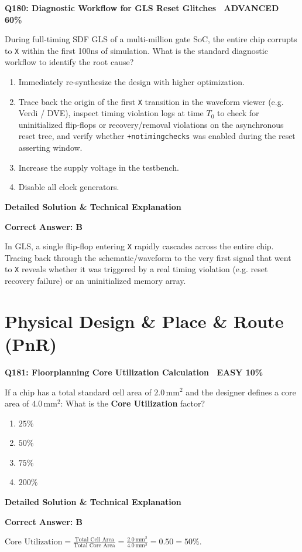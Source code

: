 \documentclass[11pt,a4paper]{article}
\newcommand{\badgeadv}{{\color{white}\colorbox{advred}{\bfseries\sffamily\tiny\ ADVANCED 60\%\ }}}
\newcommand{\badgeeasy}{{\color{white}\colorbox{easygreen}{\bfseries\sffamily\tiny\ EASY 10\%\ }}}
\newenvironment{qbox}[2]{%
  \begin{mdframed}[style=qstyle]%
  {\bfseries\sffamily\color{primaryblue}#1 \hfill #2}\par\vspace{2pt}%
}{%
  \end{mdframed}%
}
\newenvironment{ansbox}{%
  \begin{mdframed}[style=ansstyle]%
  {\bfseries\sffamily\color{ansgreen}\small Detailed Solution \& Technical Explanation}\par\vspace{2pt}\small%
}{%
  \end{mdframed}%
}
\begin{document}
\begin{qbox}{Q180: Diagnostic Workflow for GLS Reset Glitches}{\badgeadv}
During full-timing SDF GLS of a multi-million gate SoC, the entire chip corrupts to \texttt{X} within the first 100ns of simulation. What is the standard diagnostic workflow to identify the root cause?
\begin{enumerate}[label=\textbf{\Alph*.}]
  \item Immediately re-synthesize the design with higher optimization.
  \item Trace back the origin of the first \texttt{X} transition in the waveform viewer (e.g. Verdi / DVE), inspect timing violation logs at time $T_0$ to check for uninitialized flip-flops or recovery/removal violations on the asynchronous reset tree, and verify whether \texttt{+notimingchecks} was enabled during the reset asserting window.
  \item Increase the supply voltage in the testbench.
  \item Disable all clock generators.
\end{enumerate}
\end{qbox}
\begin{ansbox}
\textbf{Correct Answer: B}

In GLS, a single flip-flop entering \texttt{X} rapidly cascades across the entire chip. Tracing back through the schematic/waveform to the very first signal that went to \texttt{X} reveals whether it was triggered by a real timing violation (e.g. reset recovery failure) or an uninitialized memory array.
\end{ansbox}

\section{Physical Design \& Place \& Route (PnR)}

\begin{qbox}{Q181: Floorplanning Core Utilization Calculation}{\badgeeasy}
If a chip has a total standard cell area of $2.0\,\text{mm}^2$ and the designer defines a core area of $4.0\,\text{mm}^2$:
What is the \textbf{Core Utilization} factor?
\begin{enumerate}[label=\textbf{\Alph*.}]
  \item $25\%$
  \item $50\%$
  \item $75\%$
  \item $200\%$
\end{enumerate}
\end{qbox}
\begin{ansbox}
\textbf{Correct Answer: B}

$\text{Core Utilization} = \frac{\text{Total Cell Area}}{\text{Total Core Area}} = \frac{2.0\,\text{mm}^2}{4.0\,\text{mm}^2} = 0.50 = 50\%$.
\end{ansbox}
\end{document}
